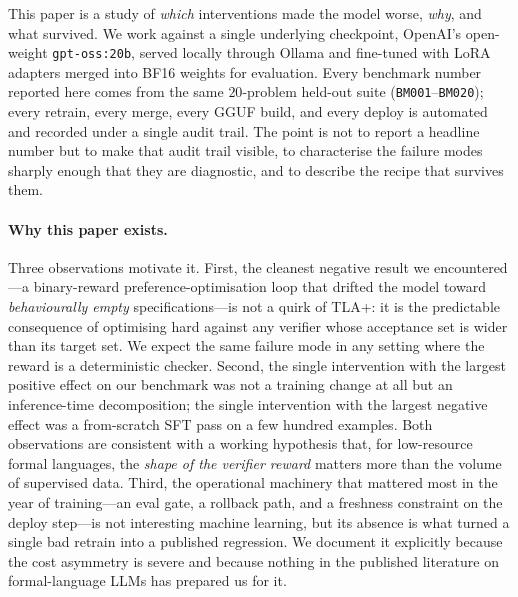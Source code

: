 \documentclass[11pt]{article}
\begin{document}
This paper is a study of \emph{which} interventions made the model worse,
\emph{why}, and what survived. We work against a single underlying
checkpoint, OpenAI's open-weight \texttt{gpt-oss:20b}, served locally
through Ollama and fine-tuned with LoRA adapters merged into BF16 weights
for evaluation. Every benchmark number reported here comes from the same
$20$-problem held-out suite (\texttt{BM001}--\texttt{BM020}); every retrain,
every merge, every GGUF build, and every deploy is automated and recorded
under a single audit trail. The point is not to report a headline number
but to make that audit trail visible, to characterise the failure modes
sharply enough that they are diagnostic, and to describe the recipe that
survives them.

\paragraph{Why this paper exists.} Three observations motivate it. First,
the cleanest negative result we encountered---a binary-reward
preference-optimisation loop that drifted the model toward
\emph{behaviourally empty} specifications---is not a quirk of TLA+: it is
the predictable consequence of optimising hard against any verifier whose
acceptance set is wider than its target set. We expect the same failure
mode in any setting where the reward is a deterministic checker. Second,
the single intervention with the largest positive effect on our benchmark
was not a training change at all but an inference-time decomposition; the
single intervention with the largest negative effect was a from-scratch
SFT pass on a few hundred examples. Both observations are consistent with
a working hypothesis that, for low-resource formal languages, the
\emph{shape of the verifier reward} matters more than the volume of
supervised data. Third, the operational machinery that mattered most in
the year of training---an eval gate, a rollback path, and a freshness
constraint on the deploy step---is not interesting machine learning, but
its absence is what turned a single bad retrain into a published
regression. We document it explicitly because the cost asymmetry is
severe and because nothing in the published literature on formal-language
LLMs has prepared us for it.
\end{document}
